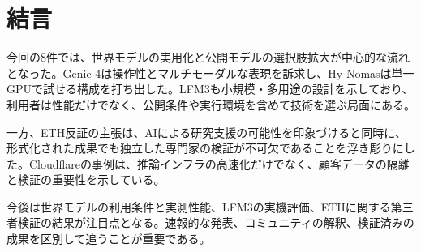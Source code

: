 \section*{結言}
今回の8件では、世界モデルの実用化と公開モデルの選択肢拡大が中心的な流れとなった。Genie 4は操作性とマルチモーダルな表現を訴求し、Hy-Nomasは単一GPUで試せる構成を打ち出した。LFM3も小規模・多用途の設計を示しており、利用者は性能だけでなく、公開条件や実行環境を含めて技術を選ぶ局面にある。

一方、ETH反証の主張は、AIによる研究支援の可能性を印象づけると同時に、形式化された成果でも独立した専門家の検証が不可欠であることを浮き彫りにした。Cloudflareの事例は、推論インフラの高速化だけでなく、顧客データの隔離と検証の重要性を示している。

今後は世界モデルの利用条件と実測性能、LFM3の実機評価、ETHに関する第三者検証の結果が注目点となる。速報的な発表、コミュニティの解釈、検証済みの成果を区別して追うことが重要である。
